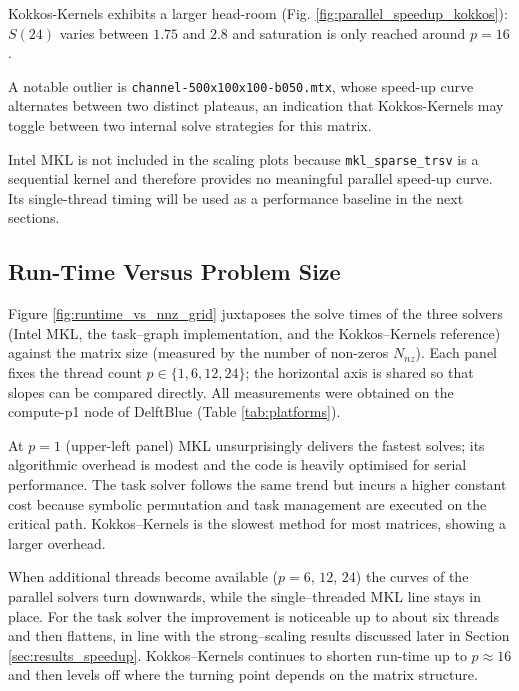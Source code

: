 Kokkos-Kernels exhibits a larger head-room
(Fig. \ref{fig:parallel_speedup_kokkos}):
$S(24)$ varies between $1.75$ and $2.8$
and saturation is only reached around $p=16$.

A notable outlier is \texttt{channel-500x100x100-b050.mtx}, whose speed-up curve alternates between two distinct plateaus, an indication that Kokkos-Kernels may toggle between two internal solve strategies for this matrix.

Intel MKL is not included in the scaling plots because
\texttt{mkl\_sparse\_trsv} is a sequential kernel
and therefore provides no meaningful parallel speed-up curve.
Its single-thread timing will be used as a performance baseline in the next sections.

\subsection{Run-Time Versus Problem Size}
\label{sec:results_runtime_vs_nnz}
Figure \ref{fig:runtime_vs_nnz_grid} juxtaposes the
solve times of the three solvers (Intel MKL, the task–graph implementation, and the
Kokkos–Kernels reference) against the matrix size
(measured by the number of non-zeros $N_{nz}$).
Each panel fixes the thread count $p\in\{1,6,12,24\}$;
the horizontal axis is shared so that slopes can be compared
directly. All measurements were obtained on the compute-p1 node of DelftBlue (Table \ref{tab:platforms}).

At $p=1$ (upper-left panel) MKL unsurprisingly delivers the
fastest solves; its algorithmic overhead is modest and
the code is heavily optimised for serial performance.
The task solver follows the same trend
but incurs a higher constant cost because symbolic
permutation and task management are executed on the critical
path.  Kokkos–Kernels is the slowest method for most matrices, showing a larger overhead.

When additional threads become available
($p=6$, $12$, $24$) the curves of the parallel solvers turn
downwards, while the single–threaded MKL line stays in place.
For the task solver the improvement is noticeable up to
about six threads and then flattens, in line with the
strong–scaling results discussed later in
Section \ref{sec:results_speedup}.
Kokkos–Kernels continues to shorten run-time up to
$p\approx 16$ and then levels off where the turning point depends
on the matrix structure.

